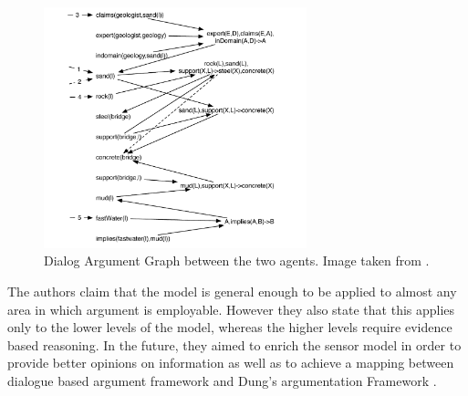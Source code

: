 \documentclass[sigconf]{acmart}
\begin{document}
\begin{figure}
  \centering
  \includegraphics[width=3in]{images/dialog.png}
  \caption{Dialog Argument Graph between the two agents. Image taken from \cite{OREN2007838}.}
  \label{fig:fig1}
\end{figure}

The authors claim that the model is general enough to be applied to almost any area in which argument is employable. However they also state that 
this applies only to the lower levels of the model, whereas the higher levels require evidence based reasoning. In the future, they aimed to enrich the sensor model 
in order to provide better opinions on information as well as to achieve a mapping between dialogue based argument framework and Dung's argumentation Framework \cite{DUNG1995321}.
\end{document}
